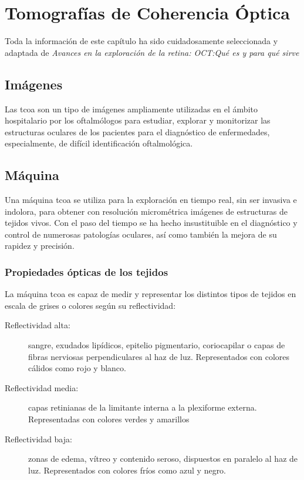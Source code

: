 \chapter{Tomografías de Coherencia Óptica}
Toda la información de este capítulo ha sido cuidadosamente
seleccionada y adaptada de \emph{Avances en la exploración de la
  retina: OCT:\@ Qué es y para qué sirve}\cite{oct-bib}

\section{Imágenes }
Las \gls{tcoa} son un tipo de imágenes ampliamente utilizadas en el
ámbito hospitalario por los oftalmólogos para estudiar, explorar y monitorizar las
estructuras oculares de los pacientes para el diagnóstico de
enfermedades, especialmente, de difícil identificación oftalmológica.

\section{Máquina }
Una máquina \gls{tcoa} se utiliza para la exploración en tiempo real, sin ser
invasiva e indolora, para obtener con resolución micrométrica imágenes
de estructuras de tejidos vivos. Con el paso del tiempo se ha hecho
insustituible en el diagnóstico y control de numerosas patologías
oculares, así como también la mejora de su rapidez y precisión.

\subsection{Propiedades ópticas de los tejidos}
La máquina \gls{tcoa} es capaz de medir y representar los distintos
tipos de tejidos en escala de grises o colores según su reflectividad:
\begin{description}
\item[Reflectividad alta:] sangre, exudados lipídicos, epitelio
  pigmentario, coriocapilar o capas de fibras nerviosas
  perpendiculares al haz de luz. Representados con colores cálidos
  como rojo y blanco.
\item[Reflectividad media:] capas retinianas de la limitante interna a
  la plexiforme externa. Representadas con colores verdes y amarillos
\item[Reflectividad baja:] zonas de edema, vítreo y contenido seroso,
  dispuestos en paralelo al haz de luz. Representados con colores
  fríos como azul y negro.
\end{description}

